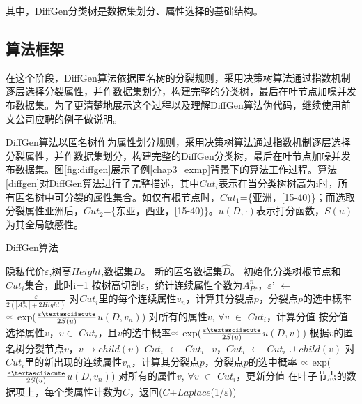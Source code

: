 其中，DiffGen分类树是数据集划分、属性选择的基础结构。

\subsection{算法框架}

在这个阶段，DiffGen算法依据匿名树的分裂规则，采用决策树算法通过指数机制逐层选择分裂属性，并作数据集划分，构建完整的分类树，最后在叶节点加噪并发布数据集。为了更清楚地展示这个过程以及理解DiffGen算法伪代码，继续使用前文公司应聘的例子做说明。

DiffGen算法以匿名树作为属性划分规则，采用决策树算法通过指数机制逐层选择分裂属性，并作数据集划分，构建完整的DiffGen分类树，最后在叶节点加噪并发布数据集。图\ref{fig:diffgen}展示了例\ref{chap3_exmp}背景下的算法工作过程。算法\ref{diffgen}对DiffGen算法进行了完整描述，其中$Cut_{i}$表示在当分类树树高为i时，所有匿名树中可分裂的属性集合。如仅有根节点时，$Cut_{1}$=\{亚洲，[15-40)\}；而选取分裂属性亚洲后，$Cut_{2}$=\{东亚，西亚，[15-40)\}。$u(D,\cdotp)$表示打分函数，$S(u)$为其全局敏感性。

\begin{algorithm}
	\caption{DiffGen算法} 
	\label{diffgen}
	\begin{algorithmic}[1]
		\REQUIRE 隐私代价$\varepsilon$,树高$Height$,数据集$D$。
		\ENSURE 新的匿名数据集$\hat{D}$。
		\STATE 初始化分类树根节点和$Cut_{i}$集合，此时i=1
		\STATE 按树高切割$\varepsilon$，统计连续属性个数为$A_{Pr}^{n}$，$\varepsilon$' $\leftarrow$ $\frac{\varepsilon}{2(|A_{Pr}^{n}|+2Hight)}$
		\STATE 对$Cut_{i}$里的每个连续属性$v_{n}$，计算其分裂点$p$，分裂点$p$的选中概率 $\wasypropto$ exp($\frac{\varepsilon\textasciiacute}{2S(u)}$$u(D,v_{n})$)
		\STATE 对所有的属性$v$, $\forall$$v$ $\in$ $Cut_{i}$，计算分值
		\STATE 按分值选择属性$v$，$v$$\in$ $Cut_{i}$，且$v$的选中概率$\wasypropto$ exp($\frac{\varepsilon\textasciiacute}{2S(u)}$$u(D,v)$)
		\STATE 根据$v$的匿名树分裂节点$v$，$v$$\rightarrow$$child(v)$
		\STATE $Cut_{i}$ $\leftarrow$ $Cut_{i}$$ - $$v$，$Cut_{i}$ $\leftarrow$ $Cut_{i}$ $\cup$ $child(v)$
		\STATE 对$Cut_{i}$里的新出现的连续属性$v_{n}$，计算其分裂点$p$，分裂点$p$的选中概率 $\wasypropto$ exp($\frac{\varepsilon\textasciiacute}{2S(u)}$$u(D,v_{n})$)
		\STATE 对所有的属性$v$, $\forall$$v$ $\in$ $Cut_{i}$，更新分值
		\ENDFOR
		\RETURN 在叶子节点的数据项上，每个类属性计数为$C$，返回($C$+$\textit{Laplace}$(1/$\varepsilon$))
	\end{algorithmic}
\end{algorithm}


